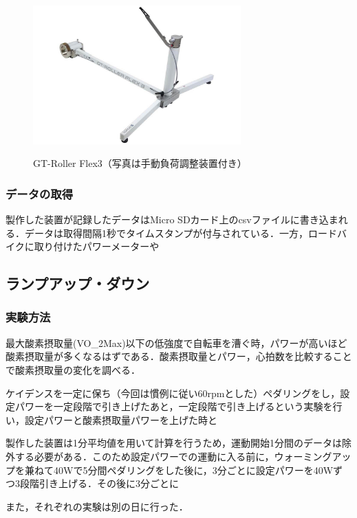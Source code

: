 \begin{figure}[h]
  \begin{center}
    \label{fig:gt-roller_flex3}
    \includegraphics[width=8cm]{fig/gt-roller_flex3.jpg}
    \caption{GT-Roller Flex3（写真は手動負荷調整装置付き）}
  \end{center}
\end{figure}

\subsubsection{データの取得}

製作した装置が記録したデータはMicro SDカード上のcsvファイルに書き込まれる．データは取得間隔1秒でタイムスタンプが付与されている．一方，ロードバイクに取り付けたパワーメーターや

\subsection{ランプアップ・ダウン}

\subsubsection{実験方法}

最大酸素摂取量(VO_2Max)以下の低強度で自転車を漕ぐ時，パワーが高いほど酸素摂取量が多くなるはずである．酸素摂取量とパワー，心拍数を比較することで酸素摂取量の変化を調べる．

ケイデンスを一定に保ち（今回は慣例に従い60rpmとした）ペダリングをし，設定パワーを一定段階で引き上げたあと，一定段階で引き上げるという実験を行い，設定パワーと酸素摂取量パワーを上げた時と

製作した装置は1分平均値を用いて計算を行うため，運動開始1分間のデータは除外する必要がある．このため設定パワーでの運動に入る前に，ウォーミングアップを兼ねて40Wで5分間ペダリングをした後に，3分ごとに設定パワーを40Wずつ3段階引き上げる．その後に3分ごとに

また，それぞれの実験は別の日に行った．

